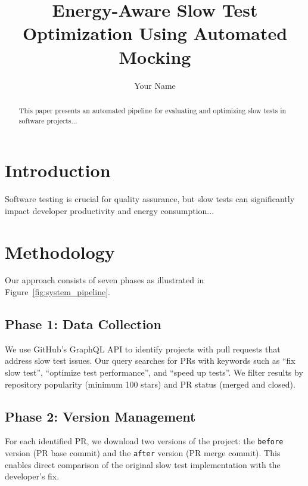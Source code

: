\documentclass{article} %
\begin{document}
\title{Energy-Aware Slow Test Optimization Using Automated Mocking}
\author{Your Name}
\maketitle

\begin{abstract}
This paper presents an automated pipeline for evaluating and optimizing slow tests in software projects...
\end{abstract}

\section{Introduction}
Software testing is crucial for quality assurance, but slow tests can significantly impact developer productivity and energy consumption...

\section{Methodology}

Our approach consists of seven phases as illustrated in Figure~\ref{fig:system_pipeline}.




% 

\subsection{Phase 1: Data Collection}
We use GitHub's GraphQL API to identify projects with pull requests that address slow test issues. Our query searches for PRs with keywords such as ``fix slow test'', ``optimize test performance'', and ``speed up tests''. We filter results by repository popularity (minimum 100 stars) and PR status (merged and closed).

\subsection{Phase 2: Version Management}
For each identified PR, we download two versions of the project: the \texttt{before} version (PR base commit) and the \texttt{after} version (PR merge commit). This enables direct comparison of the original slow test implementation with the developer's fix.
\end{document}
